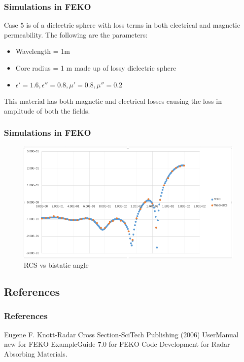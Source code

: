 \documentclass{beamer}
\begin{document}
\begin{frame}
\frametitle{Simulations in FEKO}
Case 5 is of a dielectric sphere with loss terms in both electrical and magnetic permeability. The following are the parameters:
\begin{itemize}
\item Wavelength = 1m
\item Core radius = 1 m made up of lossy dielectric sphere
\item $\epsilon' = 1.6, \epsilon'' =0.8, \mu' = 0.8, \mu''=0.2$
\end{itemize}
This material has both magnetic and electrical losses causing the loss in amplitude of both the fields.
\end{frame}
\begin{frame}
\frametitle{Simulations in FEKO}
\begin{figure}[H]
\centering
\includegraphics[width = \textwidth]{case5.PNG}
\caption{RCS vs bistatic angle}
\end{figure}
\end{frame}

\begin{frame}
\section{References}
\frametitle{References}
\footnotesize{
\begin{thebibliography}{99} %
 Eugene F. Knott-Radar Cross Section-SciTech Publishing (2006)
 UserManual new for FEKO
 ExampleGuide 7.0 for FEKO
 Code Development for Radar Absorbing Materials.
\end{thebibliography}
}
\end{frame}
\end{document}
